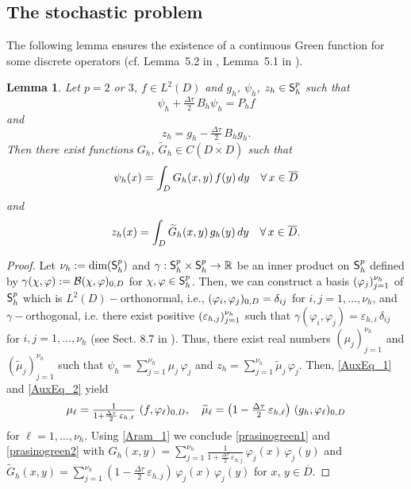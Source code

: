 \documentclass[10pt]{amsart}
\newtheorem{lemma}{Lemma}[section]
\numberwithin{equation}{section}
\begin{document}
\subsection{The stochastic problem}
The following lemma ensures the existence of a continuous
Green function for some discrete operators (cf. Lemma~5.2 in \cite{KZ2010},
Lemma~5.1 in \cite{KZ2013b}).
\begin{lemma}\label{prasinolhmma}
Let $p=2$ or $3$, $f\in L^2(D)$ and $g_h$, $\psi_h$,  $z_h\in{\sf S}_h^p$ such that
\begin{equation}\label{AuxEq_1}
\psi_h+\tfrac{\Delta\tau}{2}\,B_h\psi_h=P_hf
\end{equation}
and
\begin{equation}\label{AuxEq_2}
z_h=g_h-\tfrac{\Delta\tau}{2}\,B_hg_h.
\end{equation}
Then there exist functions $G_h$, ${\widetilde G}_h\in C({\overline {D\times D}})$
such that
\begin{equation}\label{prasinogreen1}
\psi_h(x)=\int_{{\scriptscriptstyle} D} G_h(x,y)\,f(y)\,dy\quad\forall\,x\in{\overline D}
\end{equation}
and
\begin{equation}\label{prasinogreen2}
z_h(x)=\int_{{\scriptscriptstyle} D}{\widetilde G}_h(x,y)\,g_h(y)\,dy\quad\forall\,x\in{\overline D}.
\end{equation}
\end{lemma}
\begin{proof}
Let $\nu_h:=\text{\rm dim}({\sf S}_h^p)$ and $\gamma: {\sf S}_h^p\times{\sf S}_h^p\rightarrow{{\mathbb R}}$
be an inner product on ${\sf S}_h^p$ defined by
$\gamma(\chi, \varphi) :={\mathcal B}(\chi,\varphi)_{{\scriptscriptstyle} 0,D}$
for $\chi,\varphi\in {\sf S}_h^p$.
Then, we can construct a basis $(\varphi_j)_{j=1}^{{\scriptscriptstyle} \nu_h}$ of ${\sf S}_h^p$
which is $L^2(D)-$orthonormal, i.e.,
$(\varphi_i,\varphi_j)_{{\scriptscriptstyle} 0,D}=\delta_{ij}$ for 
$i,j=1,\dots,\nu_h$,
and $\gamma-$orthogonal, i.e. there exist positive
$(\varepsilon_{h,j})_{j=1}^{{\scriptscriptstyle} \nu_h}$ such that
$\gamma(\varphi_i,\varphi_j)=\varepsilon_{h,i}\,\delta_{ij}$
for $i,j=1,\dots,\nu_h$ 
(see Sect. 8.7 in \cite{Golub}). Thus, there exist real numbers $(\mu_j)_{j=1}^{\nu_h}$
and $({\widetilde\mu}_j)_{j=1}^{\nu_h}$ such that $\psi_h=\sum_{j=1}^{\nu_h}\mu_j\,\varphi_j$
and $z_h=\sum_{j=1}^{\nu_h}{\widetilde\mu}_j\,\varphi_j$. Then, \eqref{AuxEq_1} and
\eqref{AuxEq_2} yield
\begin{equation}\label{Aram_1}
\mu_{\ell}=\tfrac{1}{1+\frac{\Delta\tau}{2}\,\varepsilon_{h,\ell}}\,\,(f,\varphi_{\ell})_{{\scriptscriptstyle} 0,D},
\quad
{\widetilde\mu}_{\ell}=\left(1-\tfrac{\Delta\tau}{2}\,\varepsilon_{h,\ell}\right)\,(g_h,\varphi_{\ell})_{{\scriptscriptstyle} 0,D}
\end{equation}
for $\ell=1,\dots,\nu_h$. Using \eqref{Aram_1} we conclude \eqref{prasinogreen1} and 
\eqref{prasinogreen2} with
$G_h(x,y)=\sum_{j=1}^{\nu_h}
\tfrac{1}{1+\frac{\Delta\tau}{2}\,\varepsilon_{h,j}}\,\varphi_j(x)\,\varphi_j(y)$
and 
${\widetilde G}_h(x,y)=\sum_{j=1}^{\nu_h}
(1-\tfrac{\Delta\tau}{2}\,\varepsilon_{h,j})\,\varphi_j(x)\,\varphi_j(y)$
for $x$, $y\in{\overline D}$.
\end{proof}
\end{document}
